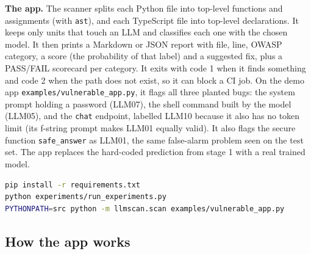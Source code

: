 \documentclass[11pt,a4paper]{article}
\newcommand{\code}[1]{\texttt{#1}}
\begin{document}
\textbf{The app.} The scanner splits each Python file into top-level functions and
assignments (with \code{ast}), and each TypeScript file into top-level declarations. It
keeps only units that touch an LLM and classifies each one with the chosen model. It then
prints a Markdown or JSON report with file, line, OWASP category, a score (the probability
of that label) and a suggested fix, plus a PASS/FAIL scorecard per category. It exits with
code 1 when it finds something and code 2 when the path does not exist, so it can block a
CI job. On the demo app \code{examples/vulnerable\_app.py}, it flags all three planted
bugs: the system prompt holding a password (LLM07), the shell command built by the model
(LLM05), and the \code{chat} endpoint, labelled LLM10 because it also has no token limit
(its f-string prompt makes LLM01 equally valid). It also flags the secure function
\code{safe\_answer} as LLM01, the same false-alarm problem seen on the test set. The app
replaces the hard-coded prediction from stage 1 with a real trained model.

\begin{lstlisting}[language=bash]
pip install -r requirements.txt
python experiments/run_experiments.py
PYTHONPATH=src python -m llmscan.scan examples/vulnerable_app.py
\end{lstlisting}

\subsection*{How the app works}
\end{document}
